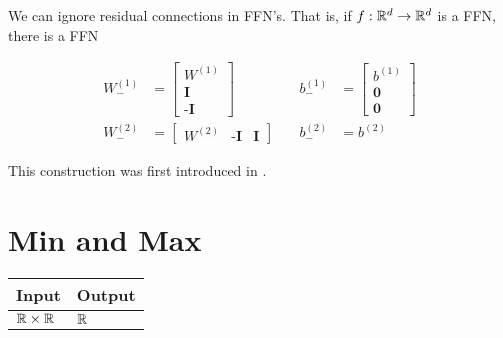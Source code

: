     We can ignore residual connections in FFN's. That is, if $f:\mathbb{R}^d\to \mathbb{R}^d$ is a FFN, there is a FFN

    \begin{align*}
        W_-^{(1)}&=\begin{bmatrix}
            W^{(1)}\\
            \textbf{I}\\
            \textbf{-I}
        \end{bmatrix}  &\quad b_-^{(1)}&=\begin{bmatrix}
            b^{(1)}\\
            \textbf{0}\\
            \textbf{0}
        \end{bmatrix}\\
        W_-^{(2)}&=\begin{bmatrix}
            W^{(2)}& \textbf{-I} & \textbf{I}
        \end{bmatrix}
        & \quad b_-^{(2)} &= b^{(2)}
    \end{align*}

    This construction was first introduced in \cite{chiang+:icml2023}.

\section{Min and Max}\label{sec:ffnn_minmax}
    \begin{tabular}{|p{1.5cm}|p{1.5cm}|}
        \hline
        \rowcolor{orange!20} %
        \textbf{Input} & \textbf{Output} \\
        \hline
        $\mathbb{R}\times\mathbb{R}$ & $\mathbb{R}$ \\
        \hline
    \end{tabular}


